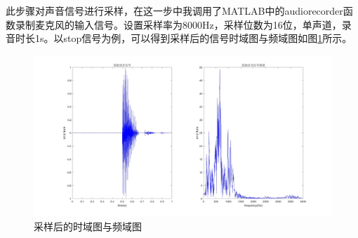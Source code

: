 \documentclass{../source/zju}
\begin{document}
           此步骤对声音信号进行采样，在这一步中我调用了MATLAB中的audiorecorder函数录制麦克风的输入信号。设置采样率为8000Hz，采样位数为16位，单声道，录音时长1s。以stop信号为例，可以得到采样后的信号时域图与频域图如图\ref{sample}所示。

        \begin{figure}[H]
            \centering
            \includegraphics[width = \textwidth]{figure/sample.jpg}
            \caption{采样后的时域图与频域图}
            \label{sample}
        \end{figure}
\end{document}
